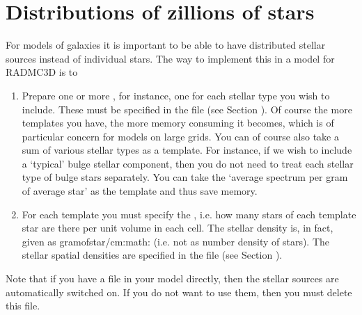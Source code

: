 \documentclass[letterpaper,10pt,english]{sphinxmanual}
\begin{document}
\section{Distributions of zillions of stars}
\label{\detokenize{stars:distributions-of-zillions-of-stars}}\label{\detokenize{stars:sec-distrib-of-stars}}
For models of galaxies it is important to be able to have distributed
stellar sources instead of individual stars. The way to implement this
in a model for RADMC\sphinxhyphen{}3D is to
\begin{enumerate}
%
\item {} 
Prepare one or more , for instance, one for each
stellar type you wish to include. These must be specified in the file
 (see Section
{\hyperref[\detokenize{inputoutputfiles:sec-stellarsrc-templates}]{}}). Of course the more templates you have, the
more memory consuming it becomes, which is of particular concern for models
on large grids. You can of course also take a sum of various stellar types as
a template. For instance, if we wish to include a ‘typical’ bulge stellar
component, then you do not need to treat each stellar type of bulge stars
separately. You can take the ‘average spectrum per gram of average star’ as
the template and thus save memory.

\item {} 
For each template you must specify the ,
i.e. how many stars of each template star are there per unit volume in
each cell. The stellar density is, in fact, given as gram\sphinxhyphen{}of\sphinxhyphen{}star/cm:math:
(i.e. not as number density of stars). The stellar spatial densities
are specified in the file  (see
Section {\hyperref[\detokenize{inputoutputfiles:sec-stellarsrc-density}]{}}).

\end{enumerate}

Note that if you have a file  in your
model directly, then the stellar sources are automatically switched on.
If you do not want to use them, then you must delete this file.
\end{document}
